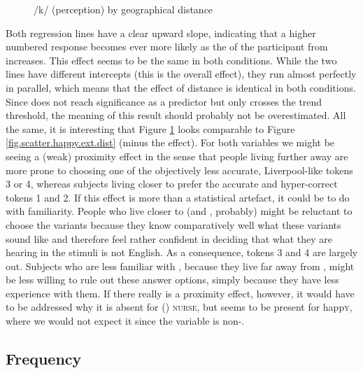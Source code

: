 \begin{figure}[h]
	\centering
		\resizebox{.49\linewidth}{!}{} 
	\caption{/k/ (perception) by geographical distance}
	\label{fig.scatter.k.ext.dist}
\end{figure}

Both regression lines have a clear upward slope, indicating that a higher numbered response becomes ever more likely as the  of the participant from  increases.
This effect seems to be the same in both conditions.
While the two lines have different intercepts (this is the overall  effect), they run almost perfectly in parallel, which means that the effect of distance is identical in both conditions.
Since  does not reach significance as a predictor but only crosses the trend threshold, the meaning of this result should probably not be overestimated.
All the same, it is interesting that Figure \ref{fig.scatter.k.ext.dist} looks comparable to Figure \ref{fig.scatter.happy.ext.dist} (minus the  effect).
For both variables we might be seeing a (weak) proximity effect in the sense that people living further away are more prone to choosing one of the objectively less accurate, Liverpool-like tokens 3 or 4, whereas subjects living closer to  prefer the accurate and hyper-correct tokens 1 and 2.
If this effect is more than a statistical artefact, it could be to do with familiarity.
People who live closer to  (and , probably) might be reluctant to choose the  variants because they know comparatively well what these variants sound like and therefore feel rather confident in deciding that what they are hearing in the stimuli is not  English.
As a consequence,  tokens 3 and 4 are largely out.
Subjects who are less familiar with , because they live far away from , might be less willing to rule out these answer options, simply because they have less experience with them.
If there really is a proximity effect, however, it would have to be addressed why it is absent for () \textsc{nurse},  but seems to be present for happ\textsc{y}, where we would not expect it since the variable is non-.

\subsection{Frequency}
\label{sec.perc_res.k.frequency}

